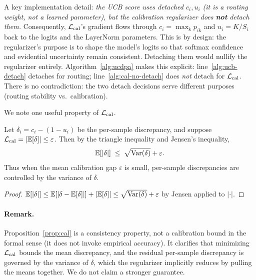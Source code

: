 \begin{remark}
\label{rem:grad-flow}
A key implementation detail: \emph{the UCB score uses detached $c_i, u_i$ (it is a routing weight, not a learned parameter), but the calibration regularizer does \textbf{not} detach them.} Consequently, $\mathcal{L}_\mathrm{cal}$'s gradient flows through $c_i = \max_k p_{ik}$ and $u_i = K/S_i$ back to the logits and the LayerNorm parameters. This is by design: the regularizer's purpose is to shape the model's logits so that softmax confidence and evidential uncertainty remain consistent. Detaching them would nullify the regularizer entirely. Algorithm~\ref{alg:ucdpa} makes this explicit: line~\ref{alg:ucb-detach} detaches for routing; line~\ref{alg:cal-no-detach} does \emph{not} detach for $\mathcal{L}_\mathrm{cal}$. There is no contradiction: the two detach decisions serve different purposes (routing stability vs.\ calibration).
\end{remark}

We note one useful property of $\mathcal{L}_\mathrm{cal}$.

\begin{proposition}
\label{prop:cal}
Let $\delta_i = c_i - (1-u_i)$ be the per-sample discrepancy, and suppose $\mathcal{L}_\mathrm{cal} = |\mathbb{E}[\delta]| \le \varepsilon$. Then by the triangle inequality and Jensen's inequality,
\[
  \mathbb{E}[|\delta|] \;\le\; \sqrt{\mathrm{Var}(\delta)} + \varepsilon.
\]
Thus when the mean calibration gap $\varepsilon$ is small, per-sample discrepancies are controlled by the variance of $\delta$.
\end{proposition}

\begin{proof}
$\mathbb{E}[|\delta|] \le \mathbb{E}[|\delta - \mathbb{E}[\delta]|] + |\mathbb{E}[\delta]| \le \sqrt{\mathrm{Var}(\delta)} + \varepsilon$ by Jensen applied to $|\cdot|$.
\end{proof}

\paragraph{Remark.}
Proposition~\ref{prop:cal} is a consistency property, not a calibration bound in the formal sense (it does not invoke empirical accuracy). It clarifies that minimizing $\mathcal{L}_\mathrm{cal}$ bounds the mean discrepancy, and the residual per-sample discrepancy is governed by the variance of $\delta$, which the regularizer implicitly reduces by pulling the means together. We do not claim a stronger guarantee.

